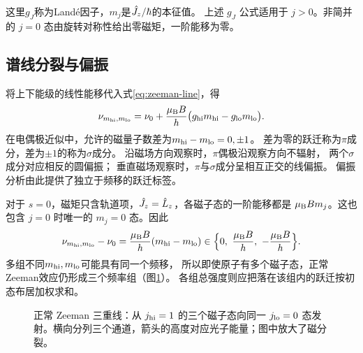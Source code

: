 这里$g_J$称为Landé因子，$m_j$是$\hat{J}_z/\hbar$的本征值。
上述 $g_J$ 公式适用于 $j > 0$。非简并的 $j = 0$ 态由旋转对称性给出零磁矩，一阶能移为零。
\subsection{谱线分裂与偏振}
\label{ss:zeeman-lines}

将上下能级的线性能移代入式\eqref{eq:zeeman-line}，得
\begin{equation}
    \nu_{m_{\mathrm{hi}},m_{\mathrm{lo}}}
    = \nu_0 + \frac{\mu_{\mathrm{B}} B}{h}
        \bigl(g_{\mathrm{hi}} m_{\mathrm{hi}} - g_{\mathrm{lo}} m_{\mathrm{lo}}\bigr).
\end{equation}
在电偶极近似中，允许的磁量子数差为$m_{\mathrm{hi}} - m_{\mathrm{lo}} = 0,\pm1$。
差为零的跃迁称为$\pi$成分，差为$\pm1$的称为$\sigma$成分。
沿磁场方向观察时，$\pi$偶极沿观察方向不辐射，
两个$\sigma$成分对应相反的圆偏振；
垂直磁场观察时，$\pi$与$\sigma$成分呈相互正交的线偏振。
偏振分析由此提供了独立于频移的跃迁标签。

对于 $s = 0$，磁矩只含轨道项，$\hat{J}_z = \hat{L}_z$，各磁子态的一阶能移都是 $\mu_{\mathrm{B}} Bm_j$。这也包含 $j = 0$ 时唯一的 $m_j = 0$ 态。因此
\begin{equation}
    \nu_{m_{\mathrm{hi}},m_{\mathrm{lo}}} - \nu_0
    = \frac{\mu_{\mathrm{B}} B}{h}(m_{\mathrm{hi}} - m_{\mathrm{lo}})
    \in \Bigl\{0,\ \frac{\mu_{\mathrm{B}} B}{h},\  -\frac{\mu_{\mathrm{B}} B}{h}\Bigr\}.
\end{equation}
多组不同$m_{\mathrm{hi}},m_{\mathrm{lo}}$可能具有同一个频移，
所以即使原子有多个磁子态，正常Zeeman效应仍形成三个频率组（图\ref{fig:zeeman-triplet}）。
各组总强度则应把落在该组内的跃迁按初态布居加权求和。
\begin{figure}[htbp]
    \centering{}
    \caption{正常 Zeeman 三重线：从 $j_{\mathrm{hi}} = 1$ 的三个磁子态向同一 $j_{\mathrm{lo}} = 0$ 态发射。横向分列三个通道，箭头的高度对应光子能量；图中放大了磁分裂。}\label{fig:zeeman-triplet}
\end{figure}

